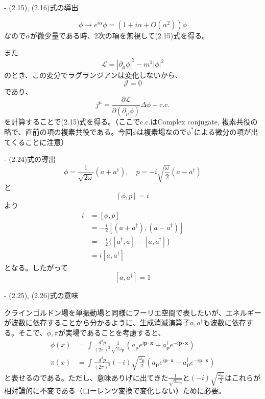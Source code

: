 - (2.15), (2.16)式の導出

\[
  \phi \to e^{i\alpha} \phi = (1 + i\alpha + O(\alpha^2)) \phi
\]
なので$\alpha$が微少量である時、2次の項を無視して(2.15)式を得る。

また
\[
\mathcal{L} = |\partial_\mu \phi|^2 - m^2 |\phi|^2
\]
のとき、この変分でラグランジアンは変化しないから、
\[
  \mathcal{J} = 0
\]
であり、
\[
  j^\mu = \frac{\partial \mathcal{L}}{\partial(\partial_\mu \phi)} \Delta \phi + \text{c.c.}
\]
を計算することで(2.15)式を得る。（ここでc.c.はComplex conjugate, 複素共役の略で、直前の項の複素共役である。今回$\phi$は複素場なので$\phi^*$による微分の項が出てくることに注意）

- (2.24)式の導出
\[
  \phi = \frac{1}{\sqrt{2\omega}} (a + a^\dagger), \quad p = -i \sqrt{\frac{\omega}{2}}(a - a^\dagger)
\]
と
\[
  [\phi, p] = i
\]
より
\begin{align*}
  i & = [\phi, p] \\
    & = - \frac{i}{2}  [(a + a^\dagger), (a - a^\dagger)] \\
    & = -\frac{i}{2} \{[a^\dagger, a] - [a, a^\dagger]\} \\
    & = i [a, a^\dagger]
\end{align*}
となる。したがって
\[
[a, a^\dagger] = 1
\]

- (2.25), (2.26)式の意味

クラインゴルドン場を単振動場と同様にフーリエ空間で表したいが、エネルギーが波数に依存することから分かるように、生成消滅演算子$a, a^\dagger$も波数に依存する。そこで、$\phi, \pi$が実場であることを考慮すると、
\begin{align*}
  \phi(x) & = \int \frac{d^3 p}{(2\pi)^3} \frac{1}{\sqrt{2\omega_{\textbf{p}}}} ( a_{\textbf{p}} e^{i \textbf{p} \cdot \textbf{x}} + a_{\textbf{p}}^\dagger e^{-i \textbf{p} \cdot \textbf{x}}) \\
  \pi(x)  & = \int \frac{d^3 p}{(2\pi)^3} (-i) \sqrt{\frac{\omega_{\textbf{p}}}{2}} ( a_{\textbf{p}} e^{i \textbf{p} \cdot \textbf{x}} - a_{\textbf{p}}^\dagger e^{-i \textbf{p} \cdot \textbf{x}})
\end{align*}
と表せるのである。ただし、意味ありげに出てきた$\frac{1}{\sqrt{2\omega_{\textbf{p}}}}$と$(-i)\sqrt{\frac{\omega_{\textbf{p}}}{2}}$はこれらが相対論的に不変である（ローレンツ変換で変化しない）ために必要。

